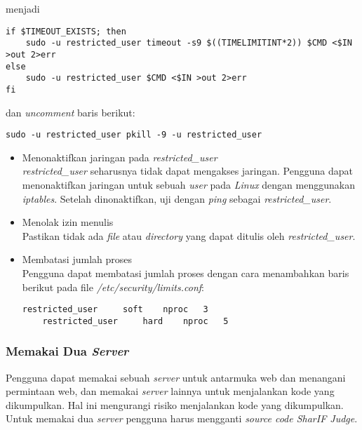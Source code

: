 menjadi

\begin{lstlisting}[basicstyle=\ttfamily, frame=single,
columns=fullflexible, keepspaces=true, breaklines=true, label=ls:15]
if $TIMEOUT_EXISTS; then
	sudo -u restricted_user timeout -s9 $((TIMELIMITINT*2)) $CMD <$IN >out 2>err
else
	sudo -u restricted_user $CMD <$IN >out 2>err        
fi
\end{lstlisting}

dan \textit{uncomment} baris berikut:

\begin{lstlisting}[basicstyle=\ttfamily, frame=single,
columns=fullflexible, keepspaces=true, breaklines=true, label=ls:16]
sudo -u restricted_user pkill -9 -u restricted_user
\end{lstlisting}

\begin{itemize}
	\item Menonaktifkan jaringan pada \textit{restricted\_user} \\
	\textit{restricted\_user} seharusnya tidak dapat mengakses jaringan. Pengguna dapat menonaktifkan jaringan untuk sebuah \textit{user} pada \textit{Linux} dengan menggunakan \textit{iptables}. Setelah dinonaktifkan, uji dengan \textit{ping} sebagai \textit{restricted\_user}.
	
	\item Menolak izin menulis \\
	Pastikan tidak ada \textit{file} atau \textit{directory} yang dapat ditulis oleh \textit{restricted\_user}.
	
	\item Membatasi jumlah proses \\
	Pengguna dapat membatasi jumlah proses dengan cara menambahkan baris berikut pada file \textit{/etc/security/limits.conf}:
	
	\begin{lstlisting}[basicstyle=\ttfamily, frame=single,
	columns=fullflexible, keepspaces=true, breaklines=true, label=ls:17]
	restricted_user     soft    nproc   3
	restricted_user     hard    nproc   5
	\end{lstlisting}
	
\end{itemize}

\subsubsection{Memakai Dua \textit{Server}}
\label{sec:memakai_dua_server}
Pengguna dapat memakai sebuah \textit{server} untuk antarmuka web dan menangani permintaan web, dan memakai \textit{server} lainnya untuk menjalankan kode yang dikumpulkan. Hal ini mengurangi risiko menjalankan kode yang dikumpulkan. Untuk memakai dua \textit{server} pengguna harus mengganti \textit{source code SharIF Judge}. 


